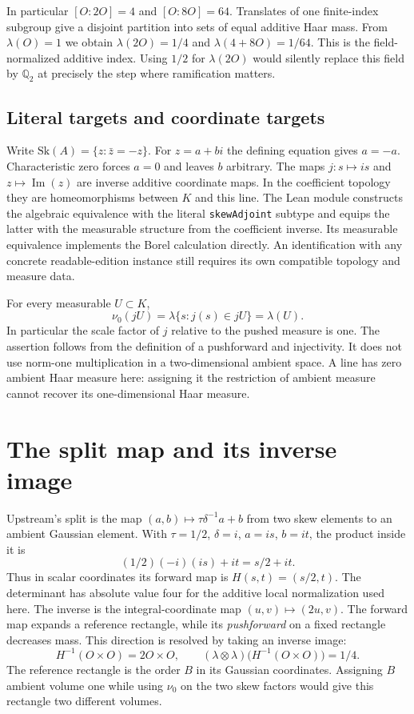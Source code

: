 \documentclass[12pt,letterpaper]{article}
\newcommand{\id}[1]{{\small\nolinkurl{#1}}}
\begin{document}
In particular $[O:2O]=4$ and $[O:8O]=64$. Translates of one finite-index subgroup give a disjoint partition into sets of equal additive Haar mass. From $\lambda(O)=1$ we obtain $\lambda(2O)=1/4$ and $\lambda(4+8O)=1/64$. This is the field-normalized additive index. Using $1/2$ for $\lambda(2O)$ would silently replace this field by $\mathbb Q_2$ at precisely the step where ramification matters.

\subsection{Literal targets and coordinate targets}
Write $\mathrm{Sk}(A)=\{z:\bar z=-z\}$. For $z=a+bi$ the defining equation gives $a=-a$. Characteristic zero forces $a=0$ and leaves $b$ arbitrary. The maps $j:s\mapsto is$ and $z\mapsto\operatorname{Im}(z)$ are inverse additive coordinate maps. In the coefficient topology they are homeomorphisms between $K$ and this line. The Lean module constructs the algebraic equivalence with the literal \id{skewAdjoint} subtype and equips the latter with the measurable structure from the coefficient inverse. Its measurable equivalence implements the Borel calculation directly. An identification with any concrete readable-edition instance still requires its own compatible topology and measure data.

For every measurable $U\subset K$,
\[
 \nu_0(jU)=\lambda\{s:j(s)\in jU\}=\lambda(U).
\]
In particular the scale factor of $j$ relative to the pushed measure is one. The assertion follows from the definition of a pushforward and injectivity. It does not use norm-one multiplication in a two-dimensional ambient space. A line has zero ambient Haar measure here: assigning it the restriction of ambient measure cannot recover its one-dimensional Haar measure.

\section{The split map and its inverse image}\label{sec:split}
Upstream's split is the map $(a,b)\mapsto\tau\delta^{-1}a+b$ from two skew elements to an ambient Gaussian element. With $\tau=1/2$, $\delta=i$, $a=is$, $b=it$, the product inside it is
\[
    (1/2)(-i)(is)+it=s/2+it.
\]
Thus in scalar coordinates its forward map is $H(s,t)=(s/2,t)$. The determinant has absolute value four for the additive local normalization used here. The inverse is the integral-coordinate map $(u,v)\mapsto(2u,v)$. The forward map expands a reference rectangle, while its \emph{pushforward} on a fixed rectangle decreases mass. This direction is resolved by taking an inverse image:
\[
  H^{-1}(O\times O)=2O\times O,\qquad
  (\lambda\otimes\lambda)\bigl(H^{-1}(O\times O)\bigr)=1/4 .
\]
The reference rectangle is the order $B$ in its Gaussian coordinates. Assigning $B$ ambient volume one while using $\nu_0$ on the two skew factors would give this rectangle two different volumes.
\end{document}
